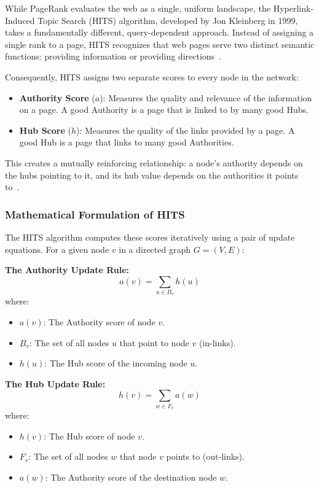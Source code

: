 While PageRank evaluates the web as a single, uniform landscape, the Hyperlink-Induced Topic Search (HITS) algorithm, developed by Jon Kleinberg in 1999, takes a fundamentally different, query-dependent approach. Instead of assigning a single rank to a page, HITS recognizes that web pages serve two distinct semantic functions: providing information or providing directions~\cite{kleinberg1999hits}.

Consequently, HITS assigns two separate scores to every node in the network:

\begin{itemize}
    \item \textbf{Authority Score} ($a$): Measures the quality and relevance of the information on a page. A good Authority is a page that is linked to by many good Hubs.
    \item \textbf{Hub Score} ($h$): Measures the quality of the links provided by a page. A good Hub is a page that links to many good Authorities.
\end{itemize}

This creates a mutually reinforcing relationship: a node's authority depends on the hubs pointing to it, and its hub value depends on the authorities it points to~\cite{kleinberg1999hits}.


\subsubsection{Mathematical Formulation of HITS}

The HITS algorithm computes these scores iteratively using a pair of update equations. For a given node $v$ in a directed graph $G = (V,E)$:

\noindent\textbf{The Authority Update Rule:}
\begin{equation}
\label{eq:hits_authority}
a(v) = \sum_{u \in B_v} h(u)
\end{equation}
where:
\begin{itemize}
    \item $a(v)$: The Authority score of node $v$.
    \item $B_v$: The set of all nodes $u$ that point to node $v$ (in-links).
    \item $h(u)$: The Hub score of the incoming node $u$.
\end{itemize}

\noindent\textbf{The Hub Update Rule:}
\begin{equation}
\label{eq:hits_hub}
h(v) = \sum_{w \in F_v} a(w)
\end{equation}
where:
\begin{itemize}
    \item $h(v)$: The Hub score of node $v$.
    \item $F_v$: The set of all nodes $w$ that node $v$ points to (out-links).
    \item $a(w)$: The Authority score of the destination node $w$.
\end{itemize}

